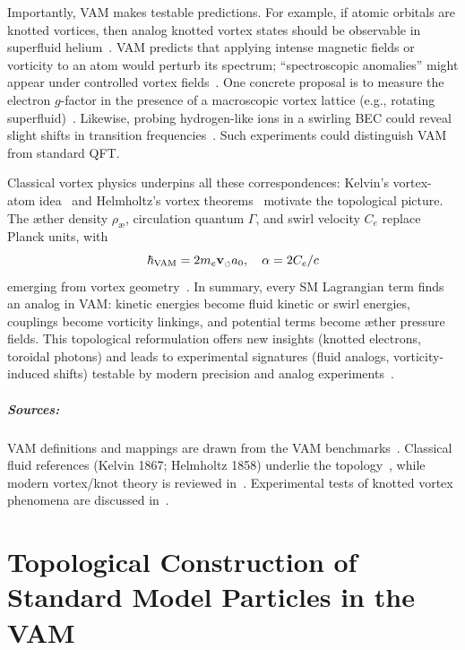 \documentclass[a4paper,12pt]{article}
\begin{document}
Importantly, VAM makes testable predictions. For example, if atomic orbitals are knotted vortices, then analog knotted vortex states should be observable in superfluid helium~\cite{vam-analog}. VAM predicts that applying intense magnetic fields or vorticity to an atom would perturb its spectrum; ``spectroscopic anomalies'' might appear under controlled vortex fields~\cite{vam-spectroscopy}. One concrete proposal is to measure the electron $g$-factor in the presence of a macroscopic vortex lattice (e.g., rotating superfluid)~\cite{vam-gfactor}. Likewise, probing hydrogen-like ions in a swirling BEC could reveal slight shifts in transition frequencies~\cite{vam-bec1, vam-bec2}. Such experiments could distinguish VAM from standard QFT.

Classical vortex physics underpins all these correspondences: Kelvin's vortex-atom idea~\cite{kelvin-vortex} and Helmholtz's vortex theorems~\cite{helmholtz-vortex} motivate the topological picture. The æther density $\rho_{æ}$, circulation quantum $\Gamma$, and swirl velocity $C_e$ replace Planck units, with
\begin{equation}
    \hbar_{\rm VAM} = 2 m_e \mathbf{v}_{\scriptscriptstyle\boldsymbol{\circlearrowleft}} a_0, \quad \alpha = 2C_e/c
\end{equation}
emerging from vortex geometry~\cite{vam-geometry1, vam-geometry2}. In summary, every SM Lagrangian term finds an analog in VAM: kinetic energies become fluid kinetic or swirl energies, couplings become vorticity linkings, and potential terms become æther pressure fields. This topological reformulation offers new insights (knotted electrons, toroidal photons) and leads to experimental signatures (fluid analogs, vorticity-induced shifts) testable by modern precision and analog experiments~\cite{vam-expt1, vam-expt2}.

\paragraph{Sources:} VAM definitions and mappings are drawn from the VAM benchmarks~\cite{vam-bench1, vam-bench2}. Classical fluid references (Kelvin 1867; Helmholtz 1858) underlie the topology~\cite{kelvin-vortex, helmholtz-vortex}, while modern vortex/knot theory is reviewed in~\cite{vam-knot1, vam-knot2}. Experimental tests of knotted vortex phenomena are discussed in~\cite{vam-expt3, vam-expt4}.



\chapter*{Topological Construction of Standard Model Particles in the VAM}
\end{document}

